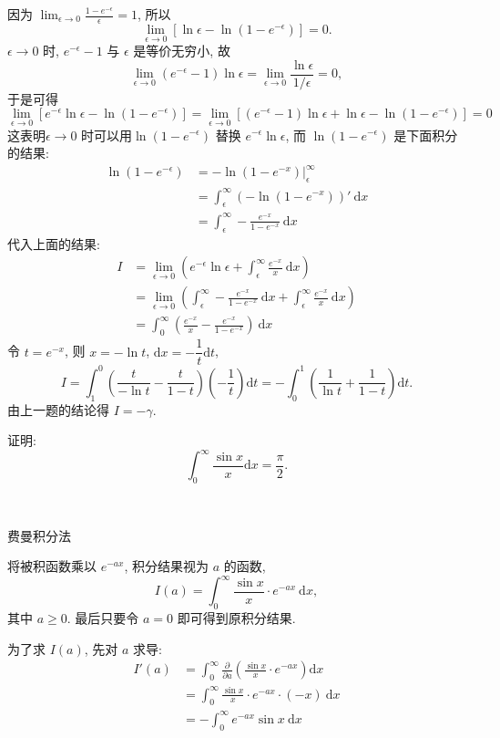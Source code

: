 因为 $\displaystyle \lim_{\epsilon\to 0}\frac{1-e^{-\epsilon}}{\epsilon} = 1$, 所以
\[\lim_{\epsilon\to 0}\left[\ln\epsilon-\ln(1-e^{-\epsilon})\right] = 0 .\]
$\epsilon\to 0$ 时, $e^{-\epsilon}-1$ 与 $\epsilon$ 是等价无穷小, 故
\[\lim_{\epsilon\to 0} (e^{-\epsilon} - 1)\ln\epsilon = \lim_{\epsilon\to 0}\frac{\ln\epsilon}{1/\epsilon} = 0 ,\]
于是可得
\[\lim_{\epsilon\to 0} \left[e^{-\epsilon}\ln\epsilon - \ln(1-e^{-\epsilon}) \right] = \lim_{\epsilon\to 0}\left[ (e^{-\epsilon}-1)\ln\epsilon + \ln\epsilon - \ln(1-e^{-\epsilon}) \right] = 0\]
这表明$\epsilon\to 0$ 时可以用$\ln(1-e^{-\epsilon})$ 替换 $e^{-\epsilon}\ln\epsilon$, 而 $\ln(1-e^{-\epsilon})$ 是下面积分的结果:
\begin{align*}
\ln(1-e^{-\epsilon}) &= -\ln(1-e^{-x})\bigg|_\epsilon^\infty \\
&= \int_\epsilon^\infty(-\ln(1-e^{-x}))'\ \mathrm{d}x \\
&=  \int_\epsilon^\infty -\frac{e^{-x}}{1-e^{-x}}\ \mathrm{d}x 
\end{align*}
代入上面的结果:
\begin{align*}
I &= \lim_{\epsilon\to 0}\left(e^{-\epsilon}\ln\epsilon + \int_\epsilon^\infty \frac{e^{-x}}{x}\ \mathrm{d}x\right)\\
&= \lim_{\epsilon\to 0}\left(\int_\epsilon^\infty -\frac{e^{-x}}{1-e^{-x}}\ \mathrm{d}x  + \int_\epsilon^\infty \frac{e^{-x}}{x}\ \mathrm{d}x\right) \\
&= \int_0^\infty \left(\frac{e^{-x}}{x} - \frac{e^{-x}}{1-e^{-x}}\right)\ \mathrm{d}x
\end{align*}
令 $t = e^{-x}$, 则 $x = -\ln t$, $\mathrm{d}x = -\dfrac{1}{t}\mathrm{d}t$, 
\[ I = \int_1^0 \left( \frac{t}{-\ln t} - \frac{t}{1-t} \right)(-\frac{1}{t})\mathrm{d}t = -\int_0^1\left(\frac{1}{\ln t}+\frac{1}{1-t}\right)\mathrm{d}t .\]
由上一题的结论得 $I = -\gamma$.


\newpage
证明:
\[\int_0^\infty \frac{\sin x}{x}\mathrm{d}x = \frac{\pi}{2}.\]

~

\noindent 费曼积分法 

将被积函数乘以 $e^{-ax}$, 积分结果视为 $a$ 的函数,  
\[ I(a) = \int_0^\infty \frac{\sin x}{x}\cdot e^{-ax}\ \mathrm{d}x ,\]
其中 $a\ge 0$. 最后只要令 $a = 0$ 即可得到原积分结果. 

为了求 $I(a)$, 先对 $a$ 求导:
\begin{align*}
I'(a) &= \int_0^\infty \frac{\partial}{\partial a}\left(\frac{\sin x}{x}\cdot e^{-ax}\right) \mathrm{d}x \\
&= \int_0^\infty \frac{\sin x}{x}\cdot e^{-ax}\cdot(-x)\ \mathrm{d}x \\
&= -\int_0^\infty e^{-ax}\sin x\ \mathrm{d}x
\end{align*}

